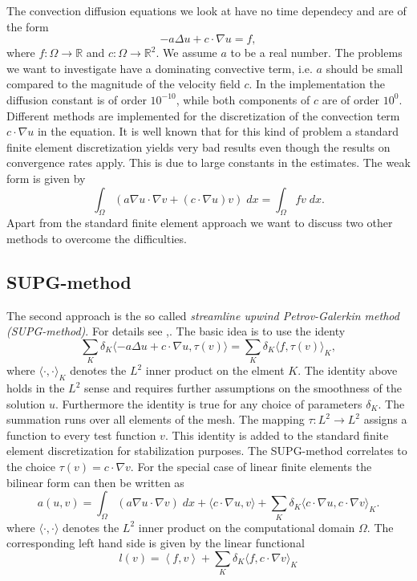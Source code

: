 The convection diffusion equations we look at have no time dependecy and are of the form
\begin{equation}
 -a \Delta u + c \cdot \nabla u = f,
\end{equation}
where $f:\Omega\to\mathbb{R}$ and $c:\Omega\to\mathbb{R}^2$. We assume $a$ to be a real number. The problems we want to investigate have a dominating convective term, i.e. $a$ should be small compared to the magnitude of the velocity field $c$. In the implementation the diffusion constant is of order $10^{-10}$, while both components of $c$ are of order $10^0$. Different methods are implemented for the discretization of the convection term $c\cdot \nabla u$ in the equation. It is well known that for this kind of problem a standard finite element discretization yields very bad results even though the results on convergence rates apply. This is due to large constants in the estimates. The weak form is given by
\begin{equation}
 \int_\Omega (a \nabla u \cdot \nabla v + (c\cdot \nabla u)v) \; dx = \int_\Omega fv \; dx.
\end{equation}
Apart from the standard finite element approach we want to discuss two other methods to overcome the difficulties.

\subsection{SUPG-method}
The second approach is the so called \textit{streamline upwind Petrov-Galerkin method (SUPG-method)}. For details see \cite{KA00},\cite{S08}. The basic idea is to use the identy
\begin{equation} \label{eq:supgg}
 \sum_{K} \delta_K \langle -a \Delta u + c \cdot \nabla u,\tau(v)\rangle = \sum_K \delta_K \langle f,\tau(v)\rangle_K,
\end{equation}
where $\langle \cdot,\cdot \rangle_K$ denotes the $L^2$ inner product on the elment $K$. The identity above holds in the $L^2$ sense and requires further assumptions on the smoothness of the solution $u$. Furthermore the identity is true for any choice of parameters $\delta_K$. The summation runs over all elements of the mesh. The mapping $\tau:L^2 \rightarrow L^2$ assigns a function to every test function $v$. This identity is added to the standard finite element discretization for stabilization purposes. The SUPG-method correlates to the choice $\tau(v)=c \cdot \nabla v$. For the special case of linear finite elements the bilinear form can then be written as
\begin{equation}
 a(u,v)=\int_\Omega (a \nabla u \cdot \nabla v) \; dx + \langle c \cdot \nabla u,v\rangle + \sum_K \delta_K \langle c \cdot \nabla u, c \cdot \nabla v\rangle_K.
 \label{eq:supg}
\end{equation}
where $\langle \cdot,\cdot \rangle$ denotes the $L^2$ inner product on the computational domain $\Omega$. The corresponding left hand side is given by the linear functional
\begin{equation}
 l(v)= \left\langle f,v \right\rangle + \sum_K \delta_K \langle f,c \cdot \nabla v\rangle_K
\end{equation}



